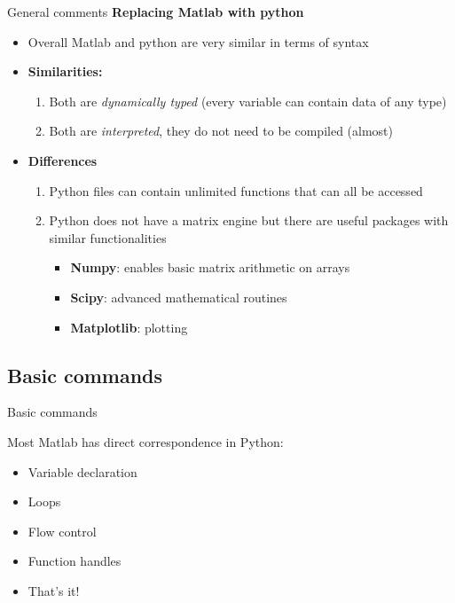 \documentclass[xcolor=x11names, compress]{beamer}
\renewcommand{\(}{\begin{columns}}
\renewcommand{\)}{\end{columns}}
\newcommand{\<}[1]{\begin{column}{#1}}
\renewcommand{\>}{\end{column}}
\begin{document}
\begin{frame}[fragile]{General comments}
\textbf{Replacing Matlab with python}
\begin{itemize}
\item Overall Matlab and python are very similar in terms of syntax
\item \textbf{Similarities:} 
	\begin{enumerate}
	\item Both are \textit{dynamically typed} (every variable can contain data of any type)
	\item Both are \textit{interpreted}, they do not need to be compiled (almost)
	\end{enumerate}
\item \textbf{Differences}
	\begin{enumerate}
	\item Python files can contain unlimited functions that can all be accessed 
	\item Python does not have a matrix engine but there are useful packages with similar functionalities
		\begin{itemize}
		\item \textbf{Numpy}: enables basic matrix arithmetic on arrays
		\item \textbf{Scipy}: advanced mathematical routines
		\item \textbf{Matplotlib}: plotting
		\end{itemize}
	\end{enumerate}
\end{itemize}
\end{frame}


\subsection{Basic commands}
\begin{frame}{Basic commands}

  \large

  Most Matlab has direct correspondence in Python:

  \vspace{5pt}

  \begin{itemize}
    \newcommand{\myitem}{\vspace{3pt} \pause \item}
    \myitem Variable declaration
    \myitem Loops
    \myitem Flow control
    \myitem Function handles
    \myitem That's it!
  \end{itemize}

\end{frame}
\end{document}

